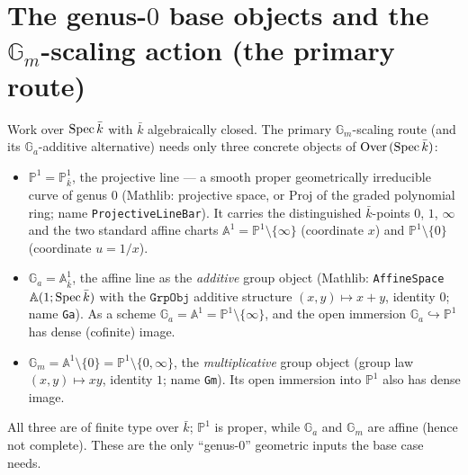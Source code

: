 \section{The genus-\(0\) base objects and the \(\mathbb G_m\)-scaling action (the primary route)}
\begin{definition}
  \label{def:genus0_base_objects}
  Work over \(\operatorname{Spec} \bar k\) with \(\bar k\) algebraically closed. The primary \(\mathbb G_m\)-scaling
  route (and its \(\mathbb G_a\)-additive alternative) needs only three concrete objects of
  \(\mathrm{Over}\,(\operatorname{Spec} \bar k)\):
  \begin{itemize}
    \item \(\mathbb P^1 = \mathbb P^1_{\bar k}\), the projective line --- a smooth proper
      geometrically irreducible curve of genus \(0\) (Mathlib: projective space, or \(\mathrm{Proj}\)
      of the graded polynomial ring; \lean name \texttt{ProjectiveLineBar}). It carries
      the distinguished \(\bar k\)-points \(0\), \(1\), \(\infty\) and the two standard affine charts
      \(\mathbb A^1 = \mathbb P^1 \setminus \{\infty\}\) (coordinate \(x\)) and
      \(\mathbb P^1 \setminus \{0\}\) (coordinate \(u = 1/x\)).
    \item \(\mathbb G_a = \mathbb A^1_{\bar k}\), the affine line as the \emph{additive} group object
      (Mathlib: \texttt{AffineSpace}\,\(\mathbb A(1; \operatorname{Spec} \bar k)\) with the \(\mathtt{GrpObj}\)
      additive structure \((x, y) \mapsto x + y\), identity \(0\); \lean name \texttt{Ga}).
      As a scheme \(\mathbb G_a = \mathbb A^1 = \mathbb P^1 \setminus \{\infty\}\), and the open
      immersion \(\mathbb G_a \hookrightarrow \mathbb P^1\) has dense (cofinite) image.
    \item \(\mathbb G_m = \mathbb A^1 \setminus \{0\} = \mathbb P^1 \setminus \{0, \infty\}\), the
      \emph{multiplicative} group object (group law \((x, y) \mapsto xy\), identity \(1\); \lean name
      \texttt{Gm}). Its open immersion into \(\mathbb P^1\) also has dense image.
  \end{itemize}
  All three are of finite type over \(\bar k\); \(\mathbb P^1\) is proper, while \(\mathbb G_a\) and
  \(\mathbb G_m\) are affine (hence not complete). These are the only ``genus-\(0\)'' geometric inputs
  the base case needs.
\end{definition}
